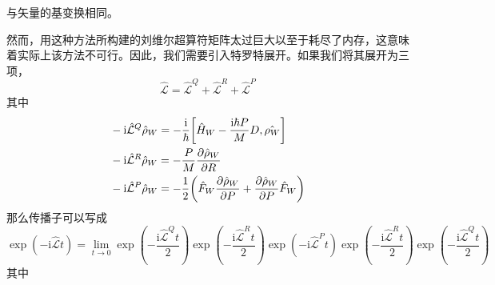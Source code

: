 \documentclass[UTF8,12pt]{article}
\begin{document}
        与矢量的基变换相同。\par
        然而，用这种方法所构建的刘维尔超算符矩阵太过巨大以至于耗尽了内存，这意味着实际上该方法不可行。因此，我们需要引入特罗特展开。如果我们将其展开为三项，
        \begin{equation}
            \hat{\mathcal{L}}=\hat{\mathcal{L}}^Q+\hat{\mathcal{L}}^R+\hat{\mathcal{L}}^P
        \end{equation}
        其中
        \begin{align}
            &-\mathrm{i}\hat{\mathcal{L}}^Q\hat{\rho}_W=-\frac{\mathrm{i}}{\hbar}\comm{\hat{H}_W-\frac{\mathrm{i}\hbar P}{M}D}{\hat{\rho_W}} \\
            &-\mathrm{i}\hat{\mathcal{L}}^R\hat{\rho}_W=-\frac{P}{M}\pdv{\hat{\rho}_W}{R} \\
            &-\mathrm{i}\hat{\mathcal{L}}^P\hat{\rho}_W=-\frac{1}{2}\qty(\hat{F}_W\pdv{\hat{\rho}_W}{P}+\pdv{\hat{\rho}_W}{P}\hat{F}_W)
        \end{align}
        那么传播子可以写成
        \begin{equation}
            \exp(-\mathrm{i}\hat{\mathcal{L}}t)=\lim_{t\rightarrow 0}\exp(-\frac{\mathrm{i}\hat{\mathcal{L}}^Qt}{2})\exp(-\frac{\mathrm{i}\hat{\mathcal{L}}^Rt}{2})\exp(-\mathrm{i}\hat{\mathcal{L}}^Pt)\exp(-\frac{\mathrm{i}\hat{\mathcal{L}}^Rt}{2})\exp(-\frac{\mathrm{i}\hat{\mathcal{L}}^Qt}{2})
        \end{equation}
        其中
\end{document}
